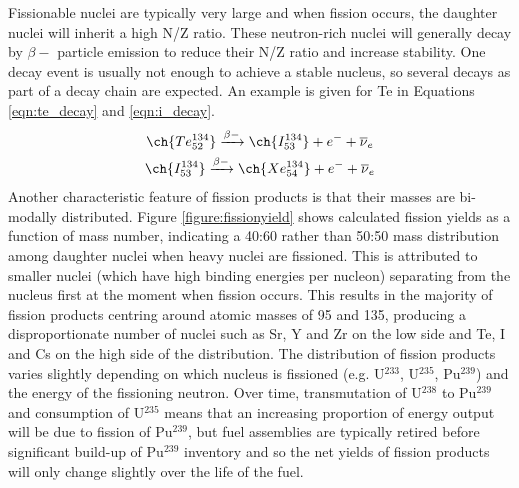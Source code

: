 Fissionable nuclei are typically very large and when fission occurs, the daughter nuclei will inherit a high N/Z ratio. These neutron-rich nuclei will generally decay by $\beta-$ particle emission to reduce their N/Z ratio and increase stability. One decay event is usually not enough to achieve a stable nucleus, so several decays as part of a decay chain are expected. An example is given for Te in Equations \ref{eqn:te_decay} and \ref{eqn:i_decay}.
\begin{gather}
\ch{Te^{134}_{52}} \xrightarrow[]{\beta-} \ch{I^{134}_{53}}+ e^{-} + \overline{\nu}_{e}
\label{eqn:te_decay} \\
\ch{I^{134}_{53}} \xrightarrow[]{\beta-} \ch{Xe^{134}_{54}} + e^{-} + \overline{\nu}_{e}
\label{eqn:i_decay}
\end{gather}
Another characteristic feature of fission products is that their masses are bi-modally distributed. Figure \ref{figure:fissionyield} shows calculated fission yields as a function of mass number, indicating a 40:60 rather than 50:50 mass distribution among daughter nuclei when heavy nuclei are fissioned. This is attributed to smaller nuclei (which have high binding energies per nucleon) separating from the nucleus first at the moment when fission occurs. This results in the majority of fission products centring around atomic masses of 95 and 135, producing a disproportionate number of nuclei such as Sr, Y and Zr on the low side and Te, I and Cs on the high side of the distribution. The distribution of fission products varies slightly depending on which nucleus is fissioned (e.g. U$^{233}$, U$^{235}$, Pu$^{239}$) and the energy of the fissioning neutron. Over time, transmutation of U$^{238}$ to Pu$^{239}$ and consumption of U$^{235}$ means that an increasing proportion of energy output will be due to fission of Pu$^{239}$, but fuel assemblies are typically retired before significant build-up of Pu$^{239}$ inventory and so the net yields of fission products will only change slightly over the life of the fuel.

